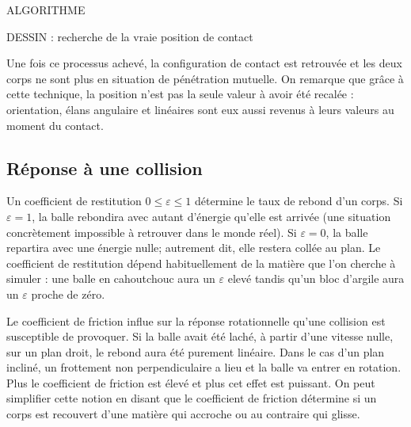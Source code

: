 ALGORITHME

DESSIN : recherche de la vraie position de contact

Une fois ce processus achevé, la configuration de contact est
retrouvée et les deux corps ne sont plus en situation de pénétration
mutuelle. On remarque que grâce à cette technique, la position n'est
pas la seule valeur à avoir été recalée : orientation, élans angulaire
et linéaires sont eux aussi revenus à leurs valeurs au moment du
contact.

\subsection{Réponse à une collision}

Un coefficient de restitution $0 \leq \varepsilon \leq 1$ détermine le
taux de rebond d'un corps. Si $\varepsilon = 1$, la balle rebondira
avec autant d'énergie qu'elle est arrivée (une situation concrètement
impossible à retrouver dans le monde réel). Si $\varepsilon = 0$, la
balle repartira avec une énergie nulle; autrement dit, elle restera
collée au plan. Le coefficient de restitution dépend habituellement de
la matière que l'on cherche à simuler : une balle en cahoutchouc aura
un $\varepsilon$ elevé tandis qu'un bloc d'argile aura un
$\varepsilon$ proche de zéro.

Le coefficient de friction influe sur la réponse rotationnelle qu'une
collision est susceptible de provoquer. Si la balle avait été laché, à
partir d'une vitesse nulle, sur un plan droit, le rebond aura été
purement linéaire. Dans le cas d'un plan incliné, un frottement non
perpendiculaire a lieu et la balle va entrer en rotation. Plus le
coefficient de friction est élevé et plus cet effet est puissant. On
peut simplifier cette notion en disant que le coefficient de friction
détermine si un corps est recouvert d'une matière qui accroche ou au
contraire qui glisse.

\cite{newton87}

